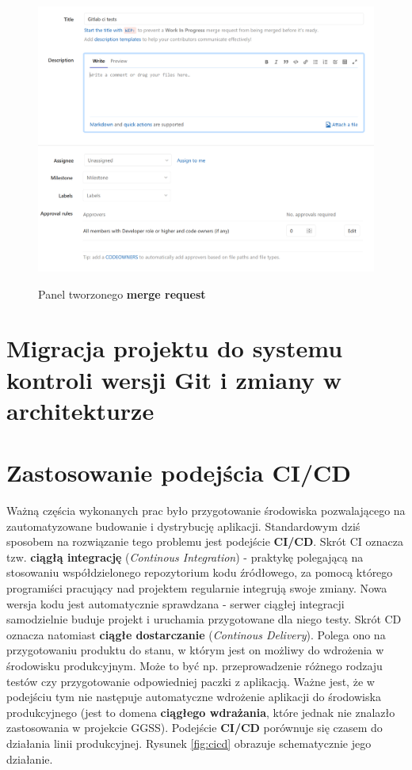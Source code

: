 \begin{figure}
\centering
\caption{Panel tworzonego \textbf{merge request}}
\includegraphics[width=\textwidth]{res/png/panelMergeRequest}
\label{fig:mergeRequestPanel}
\end{figure}

\newpage

\section{Migracja projektu do systemu kontroli wersji Git i zmiany w architekturze}

\newpage

\section{Zastosowanie podejścia CI/CD}
Ważną częścia wykonanych prac było przygotowanie środowiska pozwalającego na zautomatyzowane budowanie i dystrybucję aplikacji. Standardowym dziś sposobem na rozwiązanie tego problemu jest podejście \textbf{CI/CD}. Skrót CI oznacza tzw. \textbf{ciągłą integrację} (\textit{Continous Integration}) - praktykę polegającą na stosowaniu współdzielonego repozytorium kodu źródłowego, za pomocą którego programiści pracujący nad projektem regularnie integrują swoje zmiany. Nowa wersja kodu jest automatycznie sprawdzana - serwer ciągłej integracji samodzielnie buduje projekt i uruchamia przygotowane dla niego testy. Skrót CD oznacza natomiast \textbf{ciągłe dostarczanie} (\textit{Continous Delivery}). Polega ono na przygotowaniu produktu do stanu, w którym jest on możliwy do wdrożenia w środowisku produkcyjnym. Może to być np. przeprowadzenie różnego rodzaju testów czy przygotowanie odpowiedniej paczki z aplikacją. Ważne jest, że w podejściu tym nie następuje automatyczne wdrożenie aplikacji do środowiska produkcyjnego (jest to domena \textbf{ciągłego wdrażania}, które jednak nie znalazło zastosowania w projekcie GGSS). Podejście \textbf{CI/CD} porównuje się czasem do działania linii produkcyjnej. Rysunek \ref{fig:cicd} obrazuje schematycznie jego działanie. 

